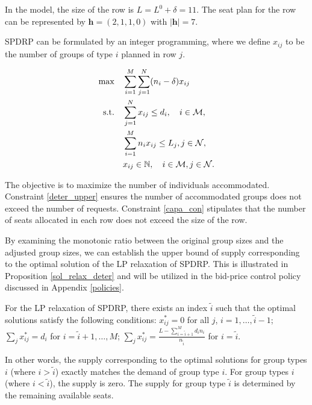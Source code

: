 In the model, the size of the row is $L = L^{0} + \delta =11$. The seat plan for the row can be represented by $\bm{h} = (2,1,1,0)$ with $|\bm{h}| = 7$.

SPDRP can be formulated by an integer programming, where we define $x_{ij}$ to be the number of groups of type $i$ planned in row $j$.

\begin{align}
    \max \quad & \sum_{i=1}^{M}  \sum_{j= 1}^{N} (n_i- \delta) x_{ij} \label{e0} \\
    \text {s.t.} \quad & \sum_{j= 1}^{N} x_{ij} \leq d_{i}, \quad i \in \mathcal{M}, \label{deter_upper}\\ 
    & \sum_{i=1}^{M} n_{i} x_{ij} \leq L_j, j \in \mathcal{N}, \label{capa_con} \\
    & x_{ij} \in \mathbb{N}, \quad i \in \mathcal{M}, j \in \mathcal{N}. \notag 
\end{align}

The objective is to maximize the number of individuals accommodated. Constraint \eqref{deter_upper} ensures the number of accommodated groups does not exceed the number of requests. Constraint \eqref{capa_con} stipulates that the number of seats allocated in each row does not exceed the size of the row.

By examining the monotonic ratio between the original group sizes and the adjusted group sizes, we can establish the upper bound of supply corresponding to the optimal solution of the LP relaxation of SPDRP. This is illustrated in Proposition \ref{sol_relax_deter} and will be utilized in the bid-price control policy discussed in Appendix \ref{policies}.

\begin{prop}\label{sol_relax_deter}
For the LP relaxation of \textup{SPDRP}, there exists an index $\tilde{i}$ such that the optimal solutions satisfy the following conditions: $x_{ij}^{*} = 0$ for all $j$, $i = 1,\ldots, \tilde{i}-1$; $\sum_{j} x_{ij}^{*} = d_{i}$ for $i = \tilde{i}+1,\ldots, M$; $\sum_{j} x_{ij}^{*} = \frac{L - \sum_{i = \tilde{i}+1}^{M} {d_i n_i}}{n_{\tilde{i}}}$ for $i = \tilde{i}$.
\end{prop}

In other words, the supply corresponding to the optimal solutions for group types $i$ (where $i > \tilde{i}$) exactly matches the demand of group type $i$. For group types $i$ (where $i < \tilde{i}$), the supply is zero. The supply for group type $\tilde{i}$ is determined by the remaining available seats.


